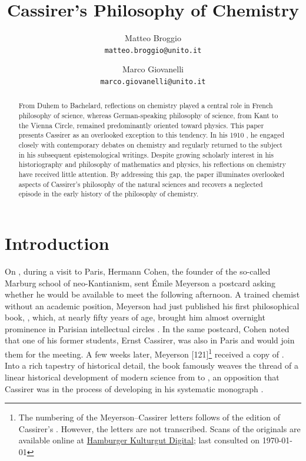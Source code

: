 \documentclass[submitted,12pt]{article}
\title{Cassirer's Philosophy of Chemistry}
\author{\small
Matteo Broggio\\
  \texttt{matteo.broggio@unito.it}
  \and
\small  Marco Giovanelli\\
  \texttt{marco.giovanelli@unito.it}
}
\newcommand{\IRt}{\bt{Identité et réalité}\xspace}
\begin{document}
\maketitle


\begin{abstract}
From Duhem to Bachelard, reflections on chemistry played a central role in French philosophy of science, whereas German-speaking philosophy of science, from Kant to the Vienna Circle, remained predominantly oriented toward physics. This paper presents Cassirer as an overlooked exception to this tendency. In his 1910 \SFt, he engaged closely with contemporary debates on chemistry and regularly returned to the subject in his subsequent epistemological writings. Despite growing scholarly interest in his historiography and philosophy of mathematics and physics, his reflections on chemistry have received little attention. By addressing this gap, the paper illuminates overlooked aspects of Cassirer’s philosophy of the natural sciences and recovers a neglected episode in the early history of the philosophy of chemistry.
\end{abstract}

\section*{Introduction}

On , during a visit to Paris, Hermann Cohen, the founder of the so-called Marburg school of neo-Kantianism, sent Émile Meyerson a postcard asking whether he would be available to meet the following afternoon. A trained chemist without an academic position, Meyerson had just published his first philosophical book, \IRt \citeyear{Meyerson1908}, which, at nearly fifty years of age, brought him almost overnight prominence in Parisian intellectual circles \citep{Laclos2009a}. In the same postcard, Cohen noted that one of his former students, Ernst Cassirer, was also in Paris and would join them for the meeting. A few weeks later, Meyerson [121]\footnote{The numbering of the Meyerson--Cassirer letters follows \cite[]{ECN} of the edition of Cassirer's . However, the letters are not transcribed. Scans of the originals are available online at
\href{https://digitalisate.sub.uni-hamburg.de/recherche?tx_dlf_listview\%5Baction\%5D=main&tx_dlf_listview\%5Bcontroller\%5D=ListView&tx_dlf_listview\%5Bpage\%5D=1&tx_dlf_listview\%5Bsearch\%5D\%5Border\%5D=&tx_dlf_listview\%5Bsearch\%5D\%5BorderBy\%5D=&tx_dlf_listview\%5Bsearch\%5D\%5Bquery\%5D=Meyerson&cHash=0d009ea45cd8a5124ca05a24b99420c9}{Hamburger Kulturgut Digital}; last consulted on \today} received a copy of \EPt \citep{Cassirer1906a,Cassirer1907b}. Into a rich tapestry of historical detail, the book famously weaves the thread of a linear historical development of modern science from \SCs to \FCs, an opposition that Cassirer was in the process of developing in his systematic monograph \SFt \citep{Cassirer1910}.
\end{document}
